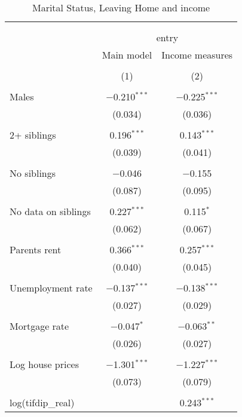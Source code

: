 
\begin{table}[!htbp] \centering 
  \caption{Marital Status, Leaving Home and income} 
  \label{employed} 
\begin{tabular}{@{\extracolsep{1pt}}lcc} 
\\[-1.8ex]\hline 
\hline \\[-1.8ex] 
\\[-1.8ex] & \multicolumn{2}{c}{entry} \\ 
 & Main model & Income measures \\ 
\\[-1.8ex] & (1) & (2)\\ 
\hline \\[-1.8ex] 
 Males & $-$0.210$^{***}$ & $-$0.225$^{***}$ \\ 
  & (0.034) & (0.036) \\ 
  & & \\ 
 2+ siblings & 0.196$^{***}$ & 0.143$^{***}$ \\ 
  & (0.039) & (0.041) \\ 
  & & \\ 
 No siblings & $-$0.046 & $-$0.155 \\ 
  & (0.087) & (0.095) \\ 
  & & \\ 
 No data on siblings & 0.227$^{***}$ & 0.115$^{*}$ \\ 
  & (0.062) & (0.067) \\ 
  & & \\ 
 Parents rent & 0.366$^{***}$ & 0.257$^{***}$ \\ 
  & (0.040) & (0.045) \\ 
  & & \\ 
 Unemployment rate & $-$0.137$^{***}$ & $-$0.138$^{***}$ \\ 
  & (0.027) & (0.029) \\ 
  & & \\ 
 Mortgage rate & $-$0.047$^{*}$ & $-$0.063$^{**}$ \\ 
  & (0.026) & (0.027) \\ 
  & & \\ 
 Log house prices & $-$1.301$^{***}$ & $-$1.227$^{***}$ \\ 
  & (0.073) & (0.079) \\ 
  & & \\ 
 log(tifdip\_real) &  & 0.243$^{***}$ \\ 

\end{tabular}
\end{table}
